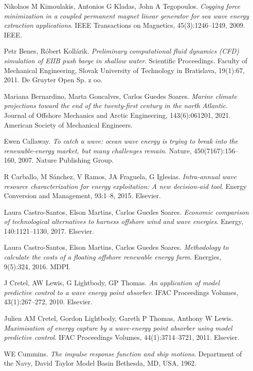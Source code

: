 \documentclass{article}
\begin{document}
\begin{thebibliography}{99}
Nikolaos M Kimoulakis, Antonios G Kladas, John A Tegopoulos.
\textit{Cogging force minimization in a coupled permanent magnet linear generator for sea wave energy extraction applications}.
IEEE Transactions on Magnetics, 45(3):1246--1249, 2009.
IEEE.

Petr Benes, Róbert Kollárik.
\textit{Preliminary computational fluid dynamics (CFD) simulation of EIIB push barge in shallow water}.
Scientific Proceedings. Faculty of Mechanical Engineering, Slovak University of Technology in Bratislava, 19(1):67, 2011.
De Gruyter Open Sp. z oo.

Mariana Bernardino, Marta Goncalves, Carlos Guedes Soares.
\textit{Marine climate projections toward the end of the twenty-first century in the north Atlantic}.
Journal of Offshore Mechanics and Arctic Engineering, 143(6):061201, 2021.
American Society of Mechanical Engineers.

Ewen Callaway.
\textit{To catch a wave: ocean wave energy is trying to break into the renewable-energy market, but many challenges remain}.
Nature, 450(7167):156--160, 2007.
Nature Publishing Group.

R Carballo, M Sánchez, V Ramos, JA Fraguela, G Iglesias.
\textit{Intra-annual wave resource characterization for energy exploitation: A new decision-aid tool}.
Energy Conversion and Management, 93:1--8, 2015.
Elsevier.

Laura Castro-Santos, Elson Martins, Carlos Guedes Soares.
\textit{Economic comparison of technological alternatives to harness offshore wind and wave energies}.
Energy, 140:1121--1130, 2017.
Elsevier.

Laura Castro-Santos, Elson Martins, Carlos Guedes Soares.
\textit{Methodology to calculate the costs of a floating offshore renewable energy farm}.
Energies, 9(5):324, 2016.
MDPI.

J Cretel, AW Lewis, G Lightbody, GP Thomas.
\textit{An application of model predictive control to a wave energy point absorber}.
IFAC Proceedings Volumes, 43(1):267--272, 2010.
Elsevier.

Julien AM Cretel, Gordon Lightbody, Gareth P Thomas, Anthony W Lewis.
\textit{Maximisation of energy capture by a wave-energy point absorber using model predictive control}.
IFAC Proceedings Volumes, 44(1):3714--3721, 2011.
Elsevier.

WE Cummins.
\textit{The impulse response function and ship motions}.
Department of the Navy, David Taylor Model Basin Bethesda, MD, USA, 1962.


\end{thebibliography}
\end{document}
